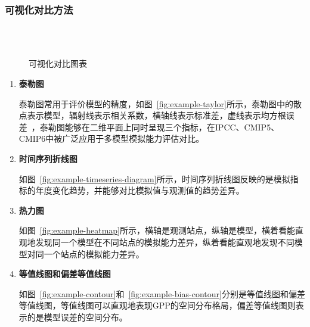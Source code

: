 \subsubsection{可视化对比方法}
\begin{figure}[!htbp]
    \centering
    \hfill
     \\
     \\
    \hfill
    \caption{可视化对比图表}
    \label{fig:ms-server-microservice}
\end{figure}
\begin{enumerate}[(1)]
\item \textbf{泰勒图}

泰勒图常用于评价模型的精度，如图~\ref{fig:example-taylor}所示，泰勒图中的散点表示模型，辐射线表示相关系数，横轴线表示标准差，虚线表示均方根误差~\cite{taylor2001summarizing}，泰勒图能够在二维平面上同时呈现三个指标，在IPCC、CMIP5、CMIP6中被广泛应用于多模型模拟能力评估对比。

\item \textbf{时间序列折线图}

如图~\ref{fig:example-timeseries-diagram}所示，时间序列折线图反映的是模拟指标的年度变化趋势，并能够对比模拟值与观测值的趋势差异。

\item \textbf{热力图}

如图~\ref{fig:example-heatmap}所示，横轴是观测站点，纵轴是模型，横着看能直观地发现同一个模型在不同站点的模拟能力差异，纵着看能直观地发现不同模型对同一个站点的模拟能力差异。

\item \textbf{等值线图和偏差等值线图}

如图~\ref{fig:example-contour}和~\ref{fig:example-bias-contour}分别是等值线图和偏差等值线图，等值线图可以直观地表现GPP的空间分布格局，偏差等值线图则表示的是模型误差的空间分布。

\end{enumerate}

